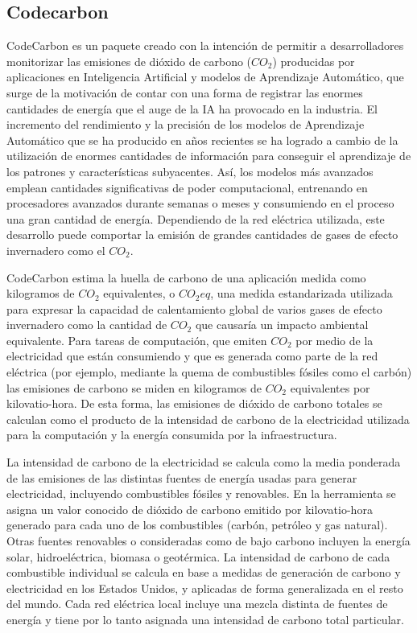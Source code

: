 \subsection{Codecarbon}

CodeCarbon \cite{codecarbon}\cite{codecarbon-software} es un paquete creado con la intención de permitir a desarrolladores monitorizar las emisiones de dióxido de carbono ($CO_{2}$) producidas por aplicaciones en Inteligencia Artificial y modelos de Aprendizaje Automático, que surge de la motivación de contar con una forma de registrar las enormes cantidades de energía que el auge de la IA ha provocado en la industria. El incremento del rendimiento y la precisión de los modelos de Aprendizaje Automático que se ha producido en años recientes se ha logrado a cambio de la utilización de enormes cantidades de información para conseguir el aprendizaje de los patrones y características subyacentes. Así, los modelos más avanzados emplean cantidades significativas de poder computacional, entrenando en procesadores avanzados durante semanas o meses y consumiendo en el proceso una gran cantidad de energía. Dependiendo de la red eléctrica utilizada, este desarrollo puede comportar la emisión de grandes cantidades de gases de efecto invernadero como el $CO_{2}$.

CodeCarbon estima la huella de carbono de una aplicación medida como kilogramos de $CO_{2}$ equivalentes, o $CO_{2}eq$, una medida estandarizada utilizada para expresar la capacidad de calentamiento global de varios gases de efecto invernadero como la cantidad de $CO_{2}$ que causaría un impacto ambiental equivalente. Para tareas de computación, que emiten $CO_{2}$ por medio de la electricidad que están consumiendo y que es generada como parte de la red eléctrica (por ejemplo, mediante la quema de combustibles fósiles como el carbón) las emisiones de carbono se miden en kilogramos de $CO_{2}$ equivalentes por kilovatio-hora. De esta forma, las emisiones de dióxido de carbono totales se calculan como el producto de la intensidad de carbono de la electricidad utilizada para la computación y la energía consumida por la infraestructura.

La intensidad de carbono de la electricidad se calcula como la media ponderada de las emisiones de las distintas fuentes de energía usadas para generar electricidad, incluyendo combustibles fósiles y renovables. En la herramienta se asigna un valor conocido de dióxido de carbono emitido por kilovatio-hora generado para cada uno de los combustibles (carbón, petróleo y gas natural). Otras fuentes renovables o consideradas como de bajo carbono incluyen la energía solar, hidroeléctrica, biomasa o geotérmica. La intensidad de carbono de cada combustible individual se calcula en base a medidas de generación de carbono y electricidad en los Estados Unidos, y aplicadas de forma generalizada en el resto del mundo. Cada red eléctrica local incluye una mezcla distinta de fuentes de energía y tiene por lo tanto asignada una intensidad de carbono total particular.

